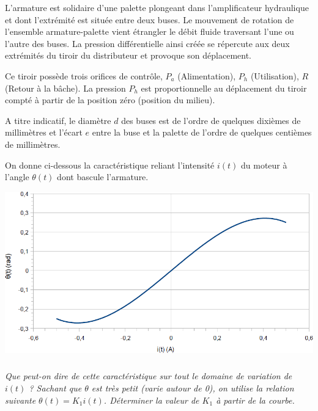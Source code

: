 \documentclass[11pt,oneside]{article}
\begin{document}
{L’armature est solidaire d’une palette plongeant dans l’amplificateur hydraulique et dont l’extrémité est située entre deux buses. Le mouvement de rotation de l’ensemble armature-palette vient étrangler le débit fluide traversant l’une ou l’autre des buses. La pression différentielle ainsi créée se répercute aux deux extrémités du tiroir du distributeur et provoque son déplacement.

Ce tiroir possède trois orifices de contrôle, $P_a$ (Alimentation), $P_h$ (Utilisation), $R$ (Retour à la bâche). La pression $P_h$ est proportionnelle au déplacement du tiroir compté à partir de la position zéro (position du milieu).

A titre indicatif, le diamètre $d$ des buses est de l’ordre de quelques dixièmes de millimètres et l’écart $e$ entre la buse et la palette de l’ordre de quelques centièmes de millimètres.

On donne ci-dessous la caractéristique reliant l'intensité $i(t)$ du moteur à l'angle $\theta(t)$ dont bascule l'armature.

\begin{center}
\includegraphics[width=.8\textwidth]{png/image8.png}
\end{center}
}
\subparagraph{}
\textit{Que peut-on dire de cette caractéristique sur tout le domaine de variation de $i(t)$ ? Sachant que $\theta$ est très petit (varie autour de 0), on utilise la relation suivante $\theta(t)=K_1i(t)$.  Déterminer la valeur de $K_1$ à partir de la courbe.}

\end{document}
